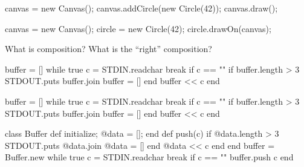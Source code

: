\documentclass{article}
\begin{document}
\begin{pptWide}{2}
{\small\begin{ffcode}
canvas = new Canvas();
canvas.addCircle(new Circle(42));
canvas.draw();
\end{ffcode}
}
\par\columnbreak\par
{\small\begin{ffcode}
canvas = new Canvas();
circle = new Circle(42);
circle.drawOn(canvas);
\end{ffcode}
}\par
\end{pptWide}
What is composition? What is the ``right'' composition?
\plush{}


\begin{pptWide}{2}
{\small\begin{ffcode}
buffer = []
while true
  c = STDIN.readchar
  break if c == "\n"
  if buffer.length > 3
    STDOUT.puts buffer.join
    buffer = []
  end
  buffer << c
end
\end{ffcode}
}
\par\columnbreak\par
{\small{}
}
\end{pptWide}
\plush{}

\begin{pptWide}{2}
{\scriptsize\begin{ffcode}
buffer = []
while true
  c = STDIN.readchar
  break if c == "\n"
  if buffer.length > 3
    STDOUT.puts buffer.join
    buffer = []
  end
  buffer << c
end
\end{ffcode}
}
\par\columnbreak\par
{\scriptsize\begin{ffcode}
class Buffer
  def initialize; @data = []; end
  def push(c)
    if @data.length > 3
      STDOUT.puts @data.join
      @data = []
    end
    @data << c
  end
end
buffer = Buffer.new
while true
  c = STDIN.readchar
  break if c == "\n"
  buffer.push c
end
\end{ffcode}
}
\end{pptWide}
\plush{}
\end{document}
